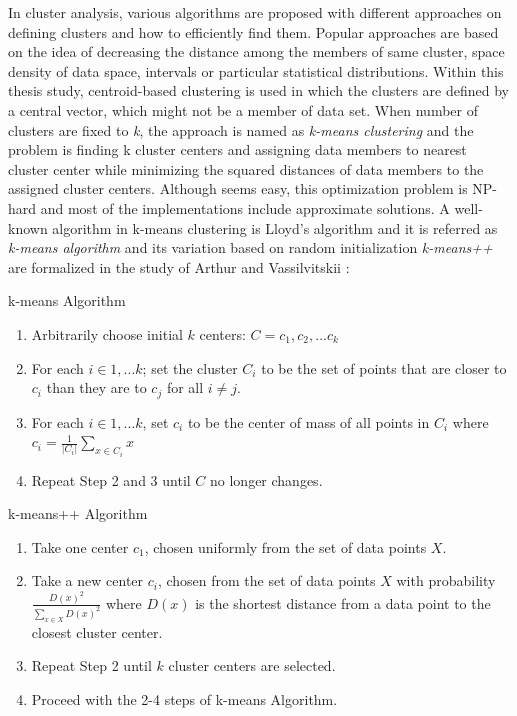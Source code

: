 In cluster analysis, various algorithms are proposed with different approaches on defining clusters and how to efficiently find them. Popular approaches are based on the idea of decreasing the distance among the members of same cluster, space density of data space, intervals or particular statistical distributions. Within this thesis study, centroid-based clustering is used in which the clusters are defined by a central vector, which might not be a member of data set. When number of clusters are fixed to \textit{k}, the approach is named as \textit{k-means clustering} and the problem is finding k cluster centers and assigning data members to nearest cluster center while minimizing the squared distances of data members to the assigned cluster centers. Although seems easy, this optimization problem is NP-hard and most of the implementations include approximate solutions. A well-known algorithm in k-means clustering is Lloyd's algorithm and it is referred as \textit{k-means algorithm} and its variation based on random initialization \textit{k-means++} are formalized in the study of Arthur and Vassilvitskii \cite{arthur2007}: 
\theoremstyle{definition}
\begin{definition}{k-means Algorithm}
\begin{enumerate}
  \item Arbitrarily choose initial $k$ centers: $C={c_1,c_2,...c_k}$
  \item For each $i \in {1,...k}$; set the cluster $C_i$ to be the set of points that are closer to $c_i$ than they are to $c_j$ for all $i \neq j$.
  \item For each $i \in {1,...k}$, set $c_i$ to be the center of mass of all points in $C_i$ where $c_i=\frac{1}{|C_i|} \sum_{x \in C_i} x$
  \item Repeat Step 2 and 3 until $C$ no longer changes.
\end{enumerate}
\end{definition}
\theoremstyle{definition}
\begin{definition}{k-means++ Algorithm}
\begin{enumerate}
  \item Take one center $c_1$, chosen uniformly from the set of data points $X$.
  \item Take a new center $c_i$, chosen from the set of data points $X$ with probability $\frac{D(x)^2}{\sum_{x \in X} D(x)^2}$ where $D(x)$ is the shortest distance from a data point to the closest cluster center.
  \item Repeat Step 2 until $k$ cluster centers are selected.
  \item Proceed with the 2-4 steps of k-means Algorithm.
\end{enumerate}
\end{definition}

